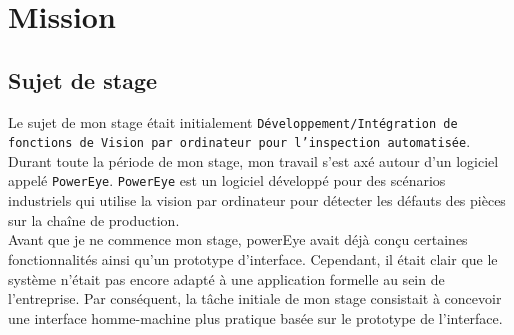 \chapter{Mission}
\section{Sujet de stage}
Le sujet de mon stage était initialement \texttt{Développement/Intégration de fonctions de Vision par ordinateur pour l’inspection automatisée}. Durant toute la période de mon stage, mon travail s'est axé autour d'un logiciel appelé \texttt{PowerEye}. \texttt{PowerEye} est un logiciel développé pour des scénarios industriels qui utilise la vision par ordinateur pour détecter les défauts des pièces sur la chaîne de production. \\

Avant que je ne commence mon stage, powerEye avait déjà conçu certaines fonctionnalités ainsi qu'un prototype d'interface. Cependant, il était clair que le système n'était pas encore adapté à une application formelle au sein de l'entreprise. Par conséquent, la tâche initiale de mon stage consistait à concevoir une interface homme-machine plus pratique basée sur le prototype de l'interface.\\

